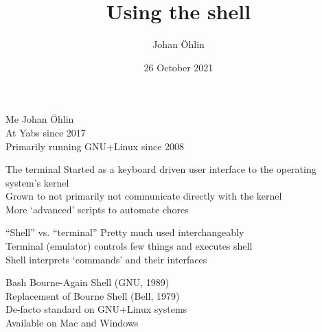 \documentclass{beamer}
\title{Using the shell}
\date{26 October 2021}
\author{Johan Öhlin}
\institute{Yabs}
\begin{document}
\maketitle

\begin{frame}{Me}
        Johan Öhlin           \\
        At Yabs since 2017    \\
        Primarily running GNU+Linux since 2008    \\
\end{frame}
\begin{frame}{The terminal}
        Started as a keyboard driven user interface to the operating system's
        kernel                                                            \\
        Grown to not primarily not communicate directly with the kernel   \\
        More `advanced' scripts to automate chores                        \\
\end{frame}

\begin{frame}{``Shell'' vs. ``terminal''}
        Pretty much used interchangeably                                  \\
        Terminal (emulator) controls few things and executes shell        \\
        Shell interprets `commands' and their interfaces                  \\
\end{frame}

\begin{frame}{Bash}
        Bourne-Again Shell (GNU, 1989)                                    \\
        Replacement of Bourne Shell (Bell, 1979)                          \\
        De-facto standard on GNU+Linux systems                            \\
        Available on Mac and Windows                                      \\
\end{frame}
\end{document}
